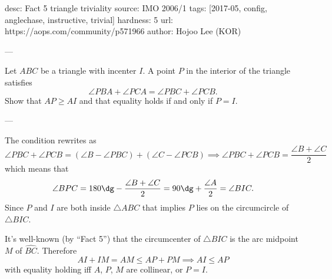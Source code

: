 desc: Fact 5 triangle triviality
source: IMO 2006/1
tags: [2017-05, config, anglechase, instructive, trivial]
hardness: 5
url: https://aops.com/community/p571966
author: Hojoo Lee (KOR)

---

Let $ABC$ be a triangle with incenter $I$.
A point $P$ in the interior of the triangle satisfies
\[ \angle PBA + \angle PCA = \angle PBC + \angle PCB. \]
Show that $AP \ge AI$ and that equality holds if and only if $P=I$.

---

The condition rewrites as
\[
  \angle PBC + \angle PCB
  = (\angle B - \angle PBC)
  + (\angle C - \angle PCB)
  \implies
  \angle PBC + \angle PCB = \frac{\angle B + \angle C}{2}
\]
which means that
\[ \angle BPC = 180\dg - \frac{\angle B + \angle C}{2}
  = 90\dg + \frac{\angle A}{2}
  = \angle BIC.
\]
Since $P$ and $I$ are both inside $\triangle ABC$
that implies $P$ lies on the circumcircle of $\triangle BIC$.

It's well-known (by ``Fact 5'') that the circumcenter
of $\triangle BIC$ is the arc midpoint $M$ of $\widehat{BC}$.
Therefore
\[ AI + IM = AM \le AP + PM \implies AI \le AP \]
with equality holding iff $A$, $P$, $M$ are collinear, or $P=I$.
